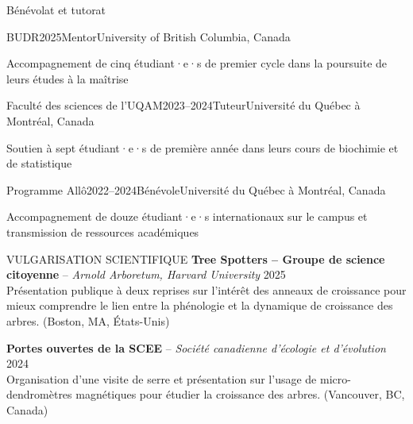 \documentclass[
	11pt, %
]{resume} %
\begin{document}

\begin{rSection}{Bénévolat et tutorat}
	\begin{rSubsection}{BUDR}{2025}{Mentor}{University of British Columbia, Canada}
		\item Accompagnement de cinq étudiant·e·s de premier cycle dans la poursuite de leurs études à la maîtrise
	\end{rSubsection}
	\begin{rSubsection}{Faculté des sciences de l’UQAM}{2023--2024}{Tuteur}{Université du Québec à Montréal, Canada}
		\item Soutien à sept étudiant·e·s de première année dans leurs cours de biochimie et de statistique
	\end{rSubsection}
	\begin{rSubsection}{Programme Allô}{2022--2024}{Bénévole}{Université du Québec à Montréal, Canada}
		\item Accompagnement de douze étudiant·e·s internationaux sur le campus et transmission de ressources académiques
	\end{rSubsection}
\end{rSection}

\begin{rSection}{VULGARISATION SCIENTIFIQUE}
  \textbf{Tree Spotters -- Groupe de science citoyenne} -- \textit{Arnold Arboretum, Harvard University} \hfill 2025 \\
  Présentation publique à deux reprises sur l’intérêt des anneaux de croissance pour mieux comprendre le lien entre la phénologie et la dynamique de croissance des arbres. (Boston, MA, États-Unis) 
  
  \textbf{Portes ouvertes de la SCEE} -- \textit{Société canadienne d’écologie et d’évolution} \hfill 2024 \\
  Organisation d’une visite de serre et présentation sur l’usage de micro-dendromètres magnétiques pour étudier la croissance des arbres. (Vancouver, BC, Canada)
 
\end{rSection}
\end{document}

